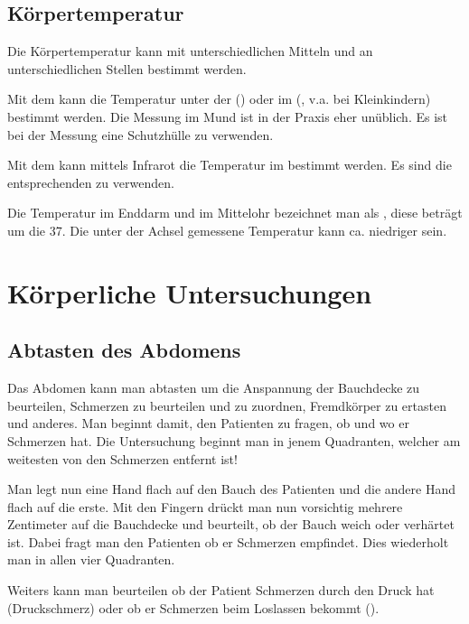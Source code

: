 \subsection{Körpertemperatur}

Die Körpertemperatur kann mit unterschiedlichen Mitteln und
an unterschiedlichen Stellen bestimmt werden. 

{
Mit dem
 kann die Temperatur
unter der  () oder im 
(, v.a. bei Kleinkindern) bestimmt werden. Die
Messung im Mund ist in der Praxis eher unüblich. Es ist bei der Messung eine
Schutzhülle zu verwenden. 

Mit dem  kann mittels Infrarot die
Temperatur im  bestimmt werden. Es sind die
entsprechenden  zu verwenden.

Die Temperatur im Enddarm und im Mittelohr bezeichnet man
als , diese beträgt um die
37\textcelsius. Die unter der Achsel gemessene Temperatur
kann ca. \textcelsius{} niedriger sein.
}{
{\SymbolText}
}


\section{Körperliche Untersuchungen}

\subsection{Abtasten des Abdomens}

{\label{topic:untersuchung-abdomen-abtasten}
Das Abdomen kann man abtasten um die Anspannung der
Bauchdecke zu beurteilen, Schmerzen zu
beurteilen und zu zuordnen, Fremdkörper zu ertasten und
anderes. Man beginnt damit, den Patienten zu fragen, ob und wo er 
Schmerzen hat. Die Untersuchung
beginnt man in jenem Quadranten, welcher am weitesten von den
Schmerzen entfernt ist!

Man legt nun eine Hand flach auf den Bauch des Patienten und
die andere Hand flach auf die erste. Mit den Fingern drückt
man nun vorsichtig mehrere Zentimeter auf die Bauchdecke und
beurteilt, ob der Bauch weich oder verhärtet ist. Dabei
fragt man den Patienten ob er Schmerzen empfindet. Dies
wiederholt man in allen vier Quadranten.

Weiters kann man beurteilen ob der Patient Schmerzen durch
den Druck hat (Druckschmerz) oder ob er Schmerzen beim
Loslassen bekommt
().
}
{
{\SymbolText}
}{}{}{}

